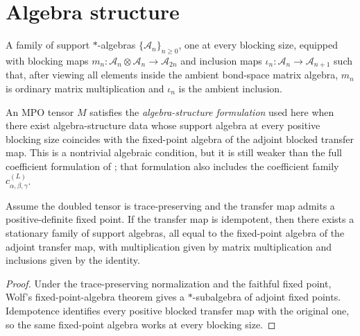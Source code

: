 \section{Algebra structure}


\begin{definition}%
    \label{def:mpdo_algebra_structure_data}
    \leanok
    A family of support $*$-algebras $\{\mathcal{A}_n\}_{n \ge 0}$, one at
    every blocking size, equipped with blocking maps
    $m_n : \mathcal{A}_n \otimes \mathcal{A}_n \to \mathcal{A}_{2n}$ and
    inclusion maps $\iota_n : \mathcal{A}_n \to \mathcal{A}_{n+1}$ such that,
    after viewing all elements inside the ambient bond-space matrix algebra,
    $m_n$ is ordinary matrix multiplication and $\iota_n$ is the ambient
    inclusion.
\end{definition}

\begin{definition}%
    \label{def:mpdo_rfp_via_algebra}
    \leanok
    An MPO tensor $M$ satisfies the \emph{algebra-structure formulation} used
    here when there exist algebra-structure data whose support algebra at every
    positive blocking size coincides with the fixed-point algebra of the adjoint
    blocked transfer map. This is a nontrivial algebraic condition, but it is still
    weaker than the full coefficient formulation of
    \cite[Theorem~4.14(ii)]{Cirac2016MPDO_arXiv}; that formulation also
    includes the coefficient family $c_{\alpha,\beta,\gamma}^{(L)}$.
\end{definition}

\begin{theorem}%
    \label{thm:mpdo_rfp_via_algebra_from_rfp}
    \leanok
    Assume the doubled tensor is trace-preserving and the transfer map admits a
    positive-definite fixed point. If the transfer map is idempotent, then there
    exists a stationary family of support algebras, all equal to the fixed-point
    algebra of the adjoint transfer map, with multiplication given by matrix
    multiplication and inclusions given by the identity.
\end{theorem}
\begin{proof}\leanok
    Under the trace-preserving normalization and the faithful fixed point, Wolf's
    fixed-point-algebra theorem gives a $*$-subalgebra of adjoint fixed points.
    Idempotence identifies every positive blocked transfer map with the original
    one, so the same fixed-point algebra works at every blocking size.
\end{proof}

